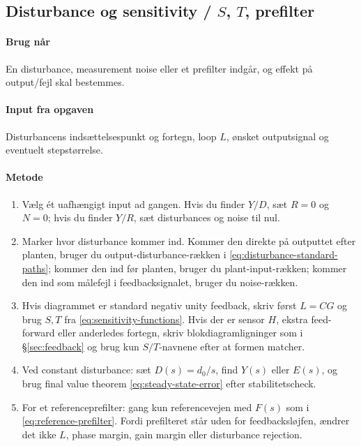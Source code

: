 \subsection{Disturbance og sensitivity / \(S\), \(T\), prefilter}
\label{sec:disturbance}

\paragraph{Brug når}
En disturbance, measurement noise eller et prefilter indgår, og effekt på output/fejl
skal bestemmes.

\paragraph{Input fra opgaven}
Disturbancens indsættelsespunkt og fortegn, loop \(L\), ønsket outputsignal og eventuelt
stepstørrelse.

\paragraph{Metode}
\begin{enumerate}
\item Vælg ét uafhængigt input ad gangen. Hvis du finder \(Y/D\), sæt \(R=0\) og
      \(N=0\); hvis du finder \(Y/R\), sæt disturbances og noise til nul.
\item Marker hvor disturbance kommer ind. Kommer den direkte på outputtet efter
      planten, bruger du output-disturbance-rækken i \eqref{eq:disturbance-standard-paths};
      kommer den ind før planten, bruger du plant-input-rækken; kommer den ind som
      målefejl i feedbacksignalet, bruger du noise-rækken.
\item Hvis diagrammet er standard negativ unity feedback, skriv først \(L=CG\) og brug
      \(S,T\) fra \eqref{eq:sensitivity-functions}. Hvis der er sensor \(H\), ekstra
      feed-forward eller anderledes fortegn, skriv blokdiagramligninger som i
      \S\ref{sec:feedback} og brug kun \(S/T\)-navnene efter at formen matcher.
\item Ved constant disturbance: sæt \(D(s)=d_0/s\), find \(Y(s)\) eller \(E(s)\), og
      brug final value theorem \eqref{eq:steady-state-error} efter stabilitetscheck.
\item For et referenceprefilter: gang kun referencevejen med \(F(s)\) som i
      \eqref{eq:reference-prefilter}. Fordi prefilteret står uden for feedbacksløjfen,
      ændrer det ikke \(L\), phase margin, gain margin eller disturbance rejection.
\end{enumerate}

